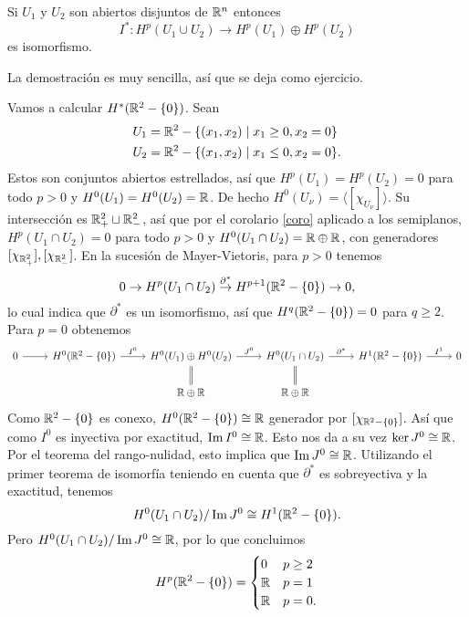 \documentclass[CV.tex]{subfiles}
\begin{document}
\begin{coro}\label{coro}
Si $U_1$ y $U_2$ son abiertos disjuntos de $\mathbb{R}^n$ entonces
\[
I^*: H^p(U_1\cup U_2)\to H^p(U_1)\oplus H^p(U_2)
\]
es isomorfismo.
\end{coro}

La demostración es muy sencilla, así que se deja como ejercicio.

\begin{ej}
Vamos a calcular $H^*(\mathbb{R}^2-\{0\})$. Sean
\begin{align*}
&U_1=\mathbb{R}^2-\{(x_1,x_2)\mid x_1\geq 0, x_2=0\}\\
&U_2=\mathbb{R}^2-\{(x_1,x_2)\mid x_1\leq 0, x_2=0\}.
\end{align*}
Estos son conjuntos abiertos estrellados, así que $H^p(U_1)=H^p(U_2)=0$ para todo $p>0$ y $H^0(U_1)=H^0(U_2)=\mathbb{R}$. De hecho $H^0(U_{\nu})=\langle [\chi_{U_{\nu}}]\rangle$. Su intersección es $\mathbb{R}^2_+\sqcup\mathbb{R}^2_-$, así que por el corolario \ref{coro} aplicado a los semiplanos, $H^p(U_1\cap U_2)=0$ para todo $p>0$ y $H^0(U_1\cap U_2)=\mathbb{R}\oplus\mathbb{R}$, con generadores $[\chi_{\mathbb{R}^2_+}],[\chi_{\mathbb{R}^2_-}]$. En la sucesión de Mayer-Vietoris, para $p>0$ tenemos
\[
0\to H^p(U_1\cap U_2)\overset{\partial^*}{\to} H^{p+1}(\mathbb{R}^2-\{0\})\to 0,
\]
lo cual indica que $\partial^*$ es un isomorfismo, así que $H^{q}(\mathbb{R}^2-\{0\})=0$ para $q\geq 2$. Para $p=0$ obtenemos
\[
\begin{tikzcd}
0\arrow[r] & H^0(\R^2-\{0\})\arrow[r,"I^0"] & H^0(U_1)\oplus H^0(U_2)\arrow[r, "J^0"]\arrow[d,equals] & H^0(U_1\cap U_2)\arrow[r,"\partial^*"]\arrow[d, equals] & H^1(\R^2-\{0\})\arrow[r,"I^1"] & 0\\
 & & \R\oplus\R &\R\oplus\R & & 
\end{tikzcd}
\]
Como $\mathbb{R}^2-\{0\}$ es conexo, $H^0(\mathbb{R}^2-\{0\})\cong\mathbb{R}$ generador por $[\chi_{\mathbb{R}^2-\{0\}}]$. Así que como $I^0$ es inyectiva por exactitud, $\operatorname{Im}{I^0}\cong\mathbb{R}$. Esto nos da a su vez $\ker{J^0}\cong\mathbb{R}$. Por el teorema del rango-nulidad, esto implica que $\operatorname{Im}{J^0}\cong\mathbb{R}$. Utilizando el primer teorema de isomorfía teniendo en cuenta que $\partial^*$ es sobreyectiva y la exactitud, tenemos
\[
H^0(U_1\cap U_2)/\operatorname{Im}{J^0}\cong H^1(\mathbb{R}^2-\{0\}).
\]
Pero $H^0(U_1\cap U_2)/\operatorname{Im}{J^0}\cong\mathbb{R}$, por lo que concluimos
\[
H^p(\mathbb{R}^2-\{0\})=\begin{cases}
0 & p\geq 2\\
\mathbb{R} & p=1\\
\mathbb{R} & p=0.
\end{cases}
\]


\end{ej}
\end{document}
